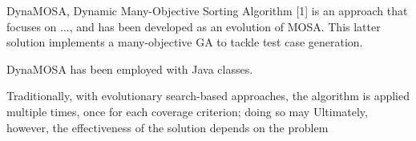 DynaMOSA, Dynamic Many-Objective Sorting Algorithm [1] is an approach that focuses on ..., and has been developed as an evolution 
of MOSA. This latter solution implements a many-objective GA to tackle test case generation.

DynaMOSA has been employed with Java classes.

Traditionally, with evolutionary search-based approaches, the algorithm is applied multiple times, 
once for each coverage criterion; doing so may 
Ultimately, however, the effectiveness of the solution depends on the problem